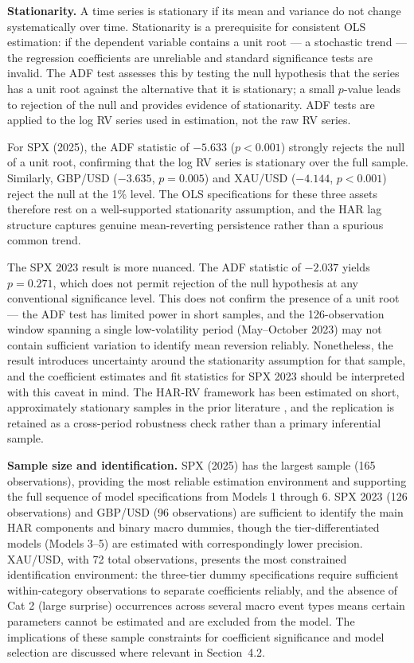 \documentclass[12pt,a4paper]{report}
\begin{document}
\noindent\textbf{Stationarity.} A time series is stationary if its mean and variance do not change systematically over time. Stationarity is a prerequisite for consistent OLS estimation: if the dependent variable contains a unit root --- a stochastic trend --- the regression coefficients are unreliable and standard significance tests are invalid. The ADF test assesses this by testing the null hypothesis that the series has a unit root against the alternative that it is stationary; a small $p$-value leads to rejection of the null and provides evidence of stationarity. ADF tests are applied to the log RV series used in estimation, not the raw RV series.

For SPX (2025), the ADF statistic of $-5.633$ ($p < 0.001$) strongly rejects the null of a unit root, confirming that the log RV series is stationary over the full sample. Similarly, GBP/USD ($-3.635$, $p = 0.005$) and XAU/USD ($-4.144$, $p < 0.001$) reject the null at the 1\% level. The OLS specifications for these three assets therefore rest on a well-supported stationarity assumption, and the HAR lag structure captures genuine mean-reverting persistence rather than a spurious common trend.

The SPX 2023 result is more nuanced. The ADF statistic of $-2.037$ yields $p = 0.271$, which does not permit rejection of the null hypothesis at any conventional significance level. This does not confirm the presence of a unit root --- the ADF test has limited power in short samples, and the 126-observation window spanning a single low-volatility period (May--October 2023) may not contain sufficient variation to identify mean reversion reliably. Nonetheless, the result introduces uncertainty around the stationarity assumption for that sample, and the coefficient estimates and fit statistics for SPX 2023 should be interpreted with this caveat in mind. The HAR-RV framework has been estimated on short, approximately stationary samples in the prior literature \citep{Corsi2009}, and the replication is retained as a cross-period robustness check rather than a primary inferential sample.

\noindent\textbf{Sample size and identification.} SPX (2025) has the largest sample (165 observations), providing the most reliable estimation environment and supporting the full sequence of model specifications from Models 1 through 6. SPX 2023 (126 observations) and GBP/USD (96 observations) are sufficient to identify the main HAR components and binary macro dummies, though the tier-differentiated models (Models 3--5) are estimated with correspondingly lower precision. XAU/USD, with 72 total observations, presents the most constrained identification environment: the three-tier dummy specifications require sufficient within-category observations to separate coefficients reliably, and the absence of Cat 2 (large surprise) occurrences across several macro event types means certain parameters cannot be estimated and are excluded from the model. The implications of these sample constraints for coefficient significance and model selection are discussed where relevant in Section~4.2.
\end{document}
